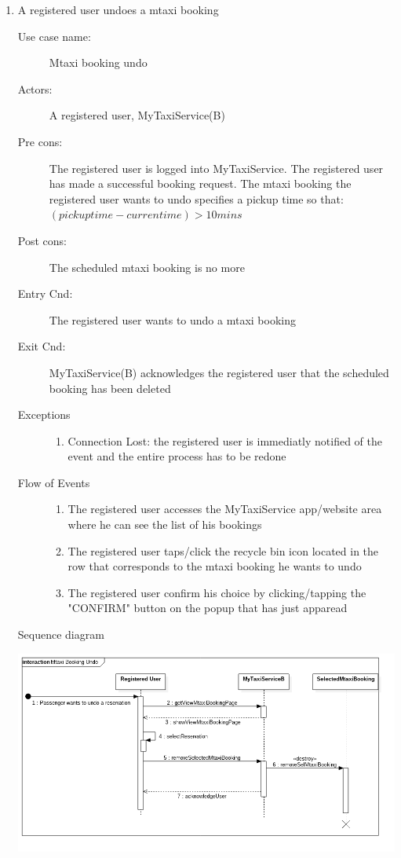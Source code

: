 \documentclass[11pt,titlepage]{article} %
\begin{document}
\begin{enumerate}
	       \item A registered user undoes a mtaxi booking
		\begin{description}
		        \item [Use case name:] Mtaxi booking undo
		        \item [Actors:] A registered user, MyTaxiService(B)
		        \item [Pre cons:] The registered user is logged into MyTaxiService. The registered user
		        has made a successful booking request. The mtaxi booking the registered user wants to undo
		        specifies a pickup time so that: \newline $(pickuptime - currentime) > 10 mins$
		        \item [Post cons:] The scheduled mtaxi booking is no more
		        \item [Entry Cnd:] The registered user wants to undo a mtaxi booking
		        \item [Exit Cnd:] MyTaxiService(B) acknowledges the registered user that the scheduled booking
		        has been deleted
		        \item [Exceptions]\hfill
			\begin{enumerate}
			          \item Connection Lost: the registered user is immediatly notified of the event and the entire process
			          has to be redone
			\end{enumerate}
		        \item [Flow of Events]\hfill
			\begin{enumerate}
			          \item The registered user accesses the MyTaxiService app/website area where he can see the list of his bookings
			          \item The registered user taps/click the recycle bin icon located in the row that corresponds to the mtaxi booking
			          he wants to undo
			          \item The registered user confirm his choice by clicking/tapping the "CONFIRM" button on
			          the popup that has just apparead
			\end{enumerate}
		\end{description}
		Sequence diagram
		\begin{center}
		\includegraphics[scale=0.52]{usecase9.png}
		\end{center}



\end{enumerate}
\end{document}
